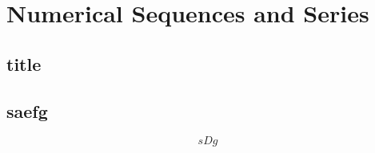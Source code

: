 %
%
% 


\chapter{Numerical Sequences and Series}
\section{title}
\section{saefg}
\begin{equation}\label{eq:test}
    sDg
\end{equation}


\endinput


